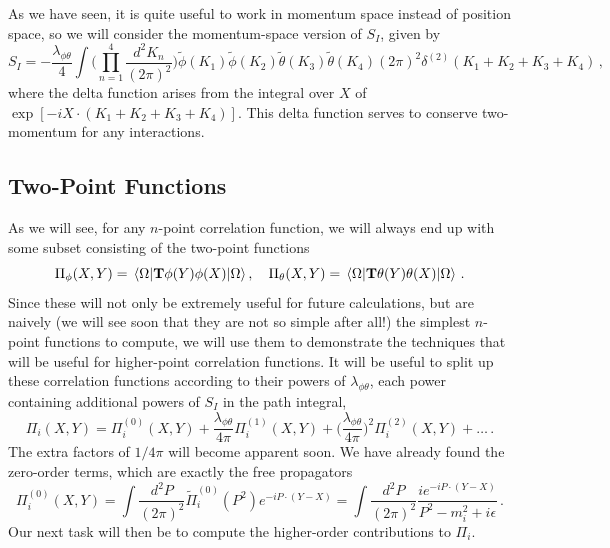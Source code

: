 \documentclass{article}
\newcommand{\td}[1]{\tilde{#1}}
\numberwithin{equation}{subsection}
\begin{document}
As we have seen, it is quite useful to work in momentum space instead of position space, so we will consider the momentum-space version of $S_I$, given by
\begin{equation}\label{eq:interactionS}
    S_I = - \frac{\lambda_{\phi\theta}}{4}\int\Bigg(\prod_{n=1}^4\frac{d^2K_n}{(2\pi)^2}\Bigg)\td{\phi}(K_1)\td\phi(K_2)\td\theta(K_3)\td\theta(K_4)(2\pi)^2\delta^{(2)}(K_1+K_2+K_3+K_4)\,,
\end{equation}
where the delta function arises from the integral over $X$ of $\exp[-iX\cdot(K_1+K_2+K_3+K_4)]$. This delta function serves to conserve two-momentum for any interactions.

\subsection{Two-Point Functions}

As we will see, for any $n$-point correlation function, we will always end up with some subset consisting of the two-point functions
\begin{equation}
    \Pi_\phi(X, Y) = \mel{\Omega}{\mathbf{T}\phi(Y)\phi(X)}{\Omega}, \quad \Pi_\theta(X, Y) = \mel{\Omega}{\mathbf{T}\theta(Y)\theta(X)}{\Omega}\,.
\end{equation}
Since these will not only be extremely useful for future calculations, but are naively (we will see soon that they are not so simple after all!) the simplest $n$-point 
functions to compute, we will use them to demonstrate the techniques that will be useful for higher-point correlation functions. It will be useful to split up these 
correlation functions according to their powers of $\lambda_{\phi\theta}$, each power containing additional powers of $S_I$ in the path integral,
\begin{equation}
    \Pi_i(X, Y) = \Pi_i^{(0)}(X, Y) + \frac{\lambda_{\phi\theta}}{4\pi}\Pi_i^{(1)}(X, Y) + \Big(\frac{\lambda_{\phi\theta}}{4\pi}\Big)^2\Pi_i^{(2)}(X, Y) + \dots\,.
\end{equation}
The extra factors of $1/4\pi$ will become apparent soon. We have already found the zero-order terms, which are exactly the free propagators
\begin{equation}
    \Pi^{(0)}_i(X, Y) = \int\frac{d^2P}{(2\pi)^2}\td\Pi^{(0)}_i(P^2)e^{-iP\cdot(Y - X)} = \int\frac{d^2P}{(2\pi)^2}\frac{ie^{-iP\cdot(Y - X)}}{P^2 - m_i^2 + i\epsilon}\,.
\end{equation}
Our next task will then be to compute the higher-order contributions to $\Pi_i$.
\end{document}
